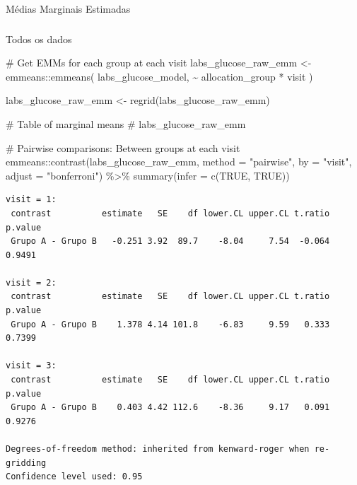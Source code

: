 \documentclass[
  12pt,
]{article}
\makeatletter
\let\oldparagraph\paragraph
\renewcommand{\paragraph}{
    \@ifstar
      \xxxParagraphStar
      \xxxParagraphNoStar
  }
\newcommand{\xxxParagraphStar}[1]{\oldparagraph*{#1}\mbox{}}
\newcommand{\xxxParagraphNoStar}[1]{\oldparagraph{#1}\mbox{}}
\let\oldsubparagraph\subparagraph
\renewcommand{\subparagraph}{
    \@ifstar
      \xxxSubParagraphStar
      \xxxSubParagraphNoStar
  }
\newcommand{\xxxSubParagraphStar}[1]{\oldsubparagraph*{#1}\mbox{}}
\newcommand{\xxxSubParagraphNoStar}[1]{\oldsubparagraph{#1}\mbox{}}
\newenvironment{Shaded}{\begin{snugshade}}{\end{snugshade}}
\newcommand{\AttributeTok}[1]{\textcolor[rgb]{0.40,0.45,0.13}{#1}}
\newcommand{\CommentTok}[1]{\textcolor[rgb]{0.37,0.37,0.37}{#1}}
\newcommand{\ConstantTok}[1]{\textcolor[rgb]{0.56,0.35,0.01}{#1}}
\newcommand{\FunctionTok}[1]{\textcolor[rgb]{0.28,0.35,0.67}{#1}}
\newcommand{\NormalTok}[1]{\textcolor[rgb]{0.00,0.23,0.31}{#1}}
\newcommand{\OtherTok}[1]{\textcolor[rgb]{0.00,0.23,0.31}{#1}}
\newcommand{\SpecialCharTok}[1]{\textcolor[rgb]{0.37,0.37,0.37}{#1}}
\newcommand{\StringTok}[1]{\textcolor[rgb]{0.13,0.47,0.30}{#1}}
\makeatother
\begin{document}
\paragraph{Médias Marginais
Estimadas}\label{muxe9dias-marginais-estimadas-8}

\subparagraph{Todos os dados}\label{todos-os-dados-8}

\begin{Shaded}
\begin{Highlighting}[]
\CommentTok{\# Get EMMs for each group at each visit}
\NormalTok{labs\_glucose\_raw\_emm }\OtherTok{\textless{}{-}}\NormalTok{ emmeans}\SpecialCharTok{::}\FunctionTok{emmeans}\NormalTok{(}
\NormalTok{    labs\_glucose\_model, }
    \SpecialCharTok{\textasciitilde{}}\NormalTok{ allocation\_group }\SpecialCharTok{*}\NormalTok{ visit}
\NormalTok{)}

\NormalTok{labs\_glucose\_raw\_emm }\OtherTok{\textless{}{-}} \FunctionTok{regrid}\NormalTok{(labs\_glucose\_raw\_emm)}

\CommentTok{\# Table of marginal means}
\CommentTok{\# labs\_glucose\_raw\_emm}

\CommentTok{\# Pairwise comparisons: Between groups at each visit}
\NormalTok{emmeans}\SpecialCharTok{::}\FunctionTok{contrast}\NormalTok{(labs\_glucose\_raw\_emm,}
\AttributeTok{method =} \StringTok{"pairwise"}\NormalTok{, }\AttributeTok{by =} \StringTok{"visit"}\NormalTok{,}
\AttributeTok{adjust =} \StringTok{"bonferroni"}\NormalTok{) }\SpecialCharTok{\%\textgreater{}\%} \FunctionTok{summary}\NormalTok{(}\AttributeTok{infer =} \FunctionTok{c}\NormalTok{(}\ConstantTok{TRUE}\NormalTok{, }\ConstantTok{TRUE}\NormalTok{))}
\end{Highlighting}
\end{Shaded}

\begin{verbatim}
visit = 1:
 contrast          estimate   SE    df lower.CL upper.CL t.ratio p.value
 Grupo A - Grupo B   -0.251 3.92  89.7    -8.04     7.54  -0.064  0.9491

visit = 2:
 contrast          estimate   SE    df lower.CL upper.CL t.ratio p.value
 Grupo A - Grupo B    1.378 4.14 101.8    -6.83     9.59   0.333  0.7399

visit = 3:
 contrast          estimate   SE    df lower.CL upper.CL t.ratio p.value
 Grupo A - Grupo B    0.403 4.42 112.6    -8.36     9.17   0.091  0.9276

Degrees-of-freedom method: inherited from kenward-roger when re-gridding 
Confidence level used: 0.95 
\end{verbatim}
\end{document}
